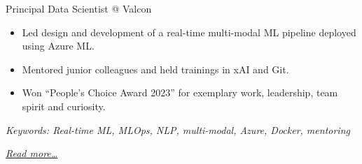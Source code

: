 \large{Principal Data Scientist @ Valcon}

\normalsize
\begin{itemize}  
    \item Led design and development of a real-time multi-modal ML pipeline deployed using Azure ML.
    \item Mentored junior colleagues and held trainings in xAI and Git.
    \item Won “People's Choice Award 2023” for exemplary work, leadership, team
    spirit and curiosity.
\end{itemize}

{\footnotesize\textit{Keywords: Real-time ML, MLOps, NLP, multi-modal, Azure, Docker, mentoring}}

\hfill{\small{\textit{\hyperref[sec:valcon]{Read more…}}}}

